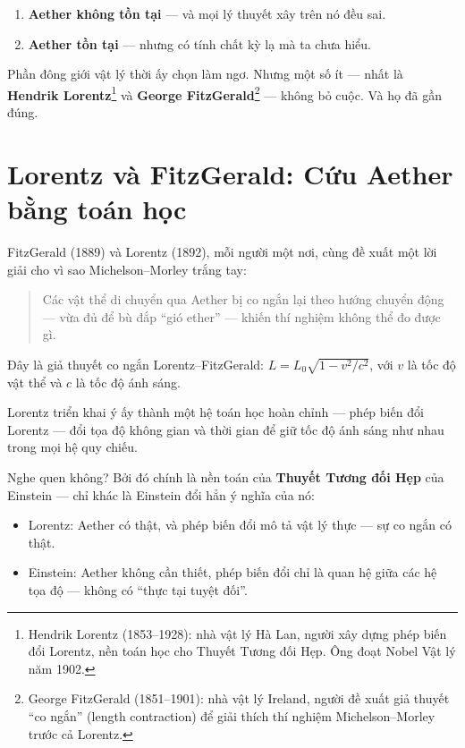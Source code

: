 \begin{enumerate}
  \item \textbf{Aether không tồn tại} — và mọi lý thuyết xây trên nó đều sai.
  \item \textbf{Aether tồn tại} — nhưng có tính chất kỳ lạ mà ta chưa hiểu.
\end{enumerate}

Phần đông giới vật lý thời ấy chọn làm ngơ. Nhưng một số ít — nhất là \textbf{Hendrik Lorentz}\footnote{Hendrik Lorentz (1853--1928): nhà vật lý Hà Lan, người xây dựng phép biến đổi Lorentz, nền toán học cho Thuyết Tương đối Hẹp. Ông đoạt Nobel Vật lý năm 1902.} và \textbf{George FitzGerald}\footnote{George FitzGerald (1851--1901): nhà vật lý Ireland, người đề xuất giả thuyết “co ngắn” (length contraction) để giải thích thí nghiệm Michelson--Morley trước cả Lorentz.} — không bỏ cuộc. Và họ đã gần đúng.


\section{Lorentz và FitzGerald: Cứu Aether bằng toán học}

FitzGerald (1889) và Lorentz (1892), mỗi người một nơi, cùng đề xuất một lời giải cho vì sao Michelson--Morley trắng tay:

\begin{quote}
Các vật thể di chuyển qua Aether bị co ngắn lại theo hướng chuyển động — vừa đủ để bù đắp “gió ether” — khiến thí nghiệm không thể đo được gì.
\end{quote}

Đây là giả thuyết co ngắn Lorentz--FitzGerald: $L = L_0 \sqrt{1 - v^2/c^2}$, với $v$ là tốc độ vật thể và $c$ là tốc độ ánh sáng.

Lorentz triển khai ý ấy thành một hệ toán học hoàn chỉnh — phép biến đổi Lorentz — đổi tọa độ không gian và thời gian để giữ tốc độ ánh sáng như nhau trong mọi hệ quy chiếu.

Nghe quen không? Bởi đó chính là nền toán của \textbf{Thuyết Tương đối Hẹp} của Einstein — chỉ khác là Einstein đổi hẳn ý nghĩa của nó:

\begin{itemize}
  \item Lorentz: Aether có thật, và phép biến đổi mô tả vật lý thực — sự co ngắn có thật.
  \item Einstein: Aether không cần thiết, phép biến đổi chỉ là quan hệ giữa các hệ tọa độ — không có “thực tại tuyệt đối”.
\end{itemize}

